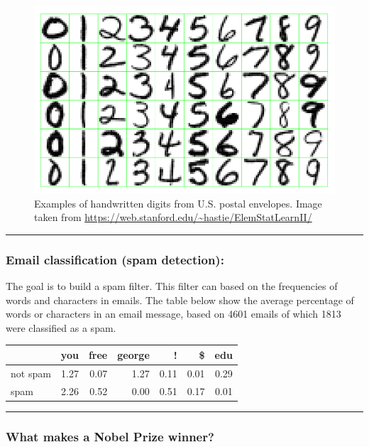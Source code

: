 \documentclass[]{article}
\begin{document}
\begin{figure}
\centering
\includegraphics{digits.png}
\caption{Examples of handwritten digits from U.S. postal envelopes.
Image taken from
\url{https://web.stanford.edu/~hastie/ElemStatLearnII/}}
\end{figure}

\begin{center}\rule{0.5\linewidth}{\linethickness}\end{center}

\hypertarget{email-classification-spam-detection}{%
\subsubsection{Email classification (spam
detection):}\label{email-classification-spam-detection}}

The goal is to build a spam filter. This filter can based on the
frequencies of words and characters in emails. The table below show the
average percentage of words or characters in an email message, based on
4601 emails of which 1813 were classified as a spam.

\begin{longtable}[]{@{}lrrrrrr@{}}
\toprule
& you & free & george & ! & \$ & edu\tabularnewline
\midrule
\endhead
not spam & 1.27 & 0.07 & 1.27 & 0.11 & 0.01 & 0.29\tabularnewline
spam & 2.26 & 0.52 & 0.00 & 0.51 & 0.17 & 0.01\tabularnewline
\bottomrule
\end{longtable}

\begin{center}\rule{0.5\linewidth}{\linethickness}\end{center}

\hypertarget{what-makes-a-nobel-prize-winner}{%
\subsubsection{What makes a Nobel Prize
winner?}\label{what-makes-a-nobel-prize-winner}}
\end{document}
